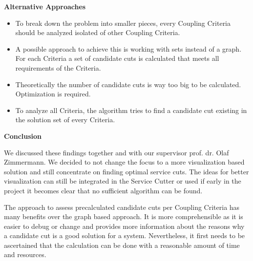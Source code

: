 \textbf{Alternative Approaches}

\begin{itemize}
	\item To break down the problem into smaller pieces, every Coupling Criteria should be analyzed isolated of other Coupling Criteria. 
	\item A possible approach to achieve this is working with sets instead of a graph. For each Criteria a set of candidate cuts is calculated that meets all requirements of the Criteria. 
	\item Theoretically the number of candidate cuts is way too big to be calculated. Optimization is required.
	\item To analyze all Criteria, the algorithm tries to find a candidate cut existing in the solution set of every Criteria. 
\end{itemize}

\textbf{Conclusion}

We discussed these findings together and with our supervisor prof. dr. Olaf Zimmermann. We decided to not change the focus to a more visualization based solution and still concentrate on finding optimal service cuts. The ideas for better visualization can still be integrated in the Service Cutter or used if early in the project it becomes clear that no sufficient algorithm can be found. 

The approach to assess precalculated candidate cuts per Coupling Criteria has many benefits over the graph based approach. It is more comprehensible as it is easier to debug or change and provides more information about the reasons why a candidate cut is a good solution for a system. Nevertheless, it first needs to be ascertained that the calculation can be done with a reasonable amount of time and resources. 